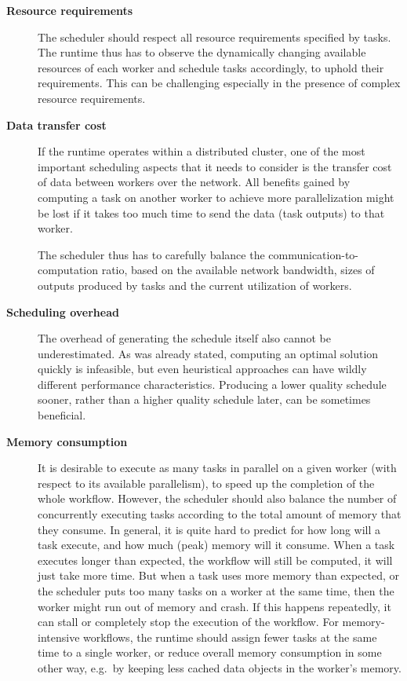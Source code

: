 \begin{description}
	\item[\textbf{Resource requirements}] The scheduler should respect all resource requirements specified by tasks. The runtime thus has to
		observe the dynamically changing available resources of each worker and schedule tasks accordingly,
		to uphold their requirements. This can be challenging especially in the presence of complex
		resource requirements.
	\item[\textbf{Data transfer cost}] If the runtime operates within a distributed cluster, one of the most important scheduling aspects
		that it needs to consider is the transfer cost of data between workers over the network. All
		benefits gained by computing a task on another worker to achieve more parallelization might be lost
		if it takes too much time to send the data (task outputs) to that worker.

		The scheduler thus has to carefully balance the communication-to-computation ratio, based on the
		available network bandwidth, sizes of outputs produced by tasks and the current utilization of
		workers.
	\item[\textbf{Scheduling overhead}] The overhead of generating the schedule itself also cannot be underestimated. As was already
		stated, computing an optimal solution quickly is infeasible, but even heuristical approaches can
		have wildly different performance characteristics. Producing a lower quality schedule sooner,
		rather than a higher quality schedule later, can be sometimes beneficial.
	\item[\textbf{Memory consumption}] It is desirable to execute as many tasks in parallel on a given worker (with respect to its
		available parallelism), to speed up the completion of the whole workflow. However, the scheduler
		should also balance the number of concurrently executing tasks according to the total amount of
		memory that they consume. In general, it is quite hard to predict for how long will a task execute,
		and how much (peak) memory will it consume. When a task executes longer than expected, the workflow
		will still be computed, it will just take more time. But when a task uses more memory than
		expected, or the scheduler puts too many tasks on a worker at the same time, then the worker might
		run out of memory and crash. If this happens repeatedly, it can stall or completely stop the
		execution of the workflow. For memory-intensive workflows, the runtime should assign fewer tasks at
		the same time to a single worker, or reduce overall memory consumption in some other way, e.g.\ by
		keeping less cached data objects in the worker's memory.
\end{description}
